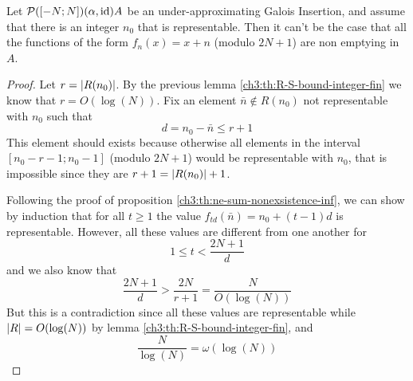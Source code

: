 \begin{prop}\label{ch3:th:ne-sum-nonexsistence-fin}
	Let $\mathcal{P}([-N; N]) (\alpha, \text{id}) A$ be an under-approximating Galois Insertion, and assume that there is an integer $n_0$ that is representable. Then it can't be the case that all the functions of the form $f_n(x) = x + n$ (modulo $2N + 1$) are non emptying in $A$.
\end{prop}
\begin{proof}
	Let $r = \lvert R(n_0)\rvert$. By the previous lemma \ref{ch3:th:R-S-bound-integer-fin} we know that $r = O(\log(N))$. Fix an element $\bar{n} \notin R(n_0)$ not representable with $n_0$ such that
	\[
	d = n_0 - \bar{n} \le r + 1
	\]
	This element should exists because otherwise all elements in the interval $[n_0 - r - 1; n_0 - 1]$ (modulo $2N + 1$) would be representable with $n_0$, that is impossible since they are $r + 1 = \lvert R(n_0)\rvert + 1$.

	Following the proof of proposition \ref{ch3:th:ne-sum-nonexsistence-inf}, we can show by induction that for all $t \ge 1$ the value $f_{td}(\bar{n}) = n_0 + (t - 1) d$ is representable. However, all these values are different from one another for
	\[
	1 \le t < \frac{2N + 1}{d}
	\]
	and we also know that
	\[
	\frac{2N + 1}{d} > \frac{2N}{r + 1} = \frac{N}{O(\log(N))}
	\]
	But this is a contradiction since all these values are representable while $\lvert R\rvert = O(\log(N))$ by lemma \ref{ch3:th:R-S-bound-integer-fin}, and
	\[
	\frac{N}{\log(N)} = \omega( \log(N) )
	\]
\end{proof}
